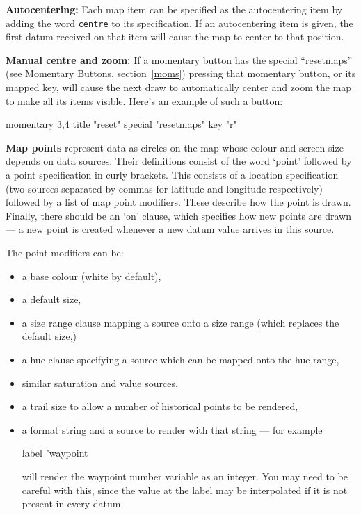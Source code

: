 \textbf{Autocentering:} Each map item can be specified as the autocentering item by
adding the word \verb+centre+ to its specification. If an autocentering item is
given, the first datum received on that item will cause the map to center to that
position.

\textbf{Manual centre and zoom:} If a momentary button has the special ``resetmaps''
(see Momentary Buttons, section~\ref{moms}) pressing that momentary button, or
its mapped key, will cause the next draw to automatically center and zoom the map
to make all its items visible. Here's an example of such a button:
\begin{v}
momentary 3,4 {
    title "reset"
    special "resetmaps"
    key "r"
}
\end{v}


\textbf{Map points} represent data as circles on the map
whose colour and screen size depends on data sources.
Their definitions consist of the word `point' followed
by a point specification in curly brackets.
This consists of a location specification
(two sources separated by commas for latitude and longitude
respectively) followed by a list of map point modifiers.
These describe how the point is drawn. Finally, there should
be an `on' clause, which specifies how new points are drawn ---
a new point is created whenever a new datum value
arrives in this source.

The point modifiers can be:
\begin{itemize}
\item a base colour (white by default),
\item a default size,
\item a size range clause mapping a source onto a size range
(which replaces the default size,)
\item a hue clause specifying a source which can be mapped onto the 
hue range,
\item similar saturation and value sources,
\item a trail size to allow a number of historical points to be rendered,
\item a format string and a source to render with that string --- for example 
\begin{v}
label "waypoint %
\end{v}
will render the waypoint number variable as an integer. You may need
to be careful with this, since the value at the label may be interpolated
if it is not present in every datum.
\end{itemize}

